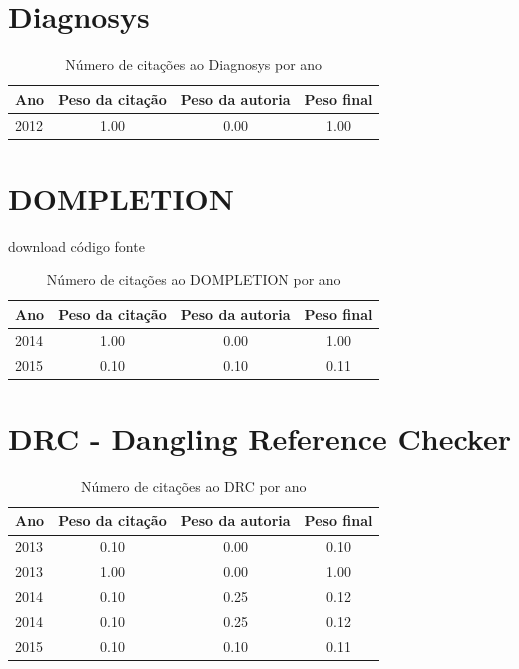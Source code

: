 \section{Diagnosys}
\begin{table}[H]
\caption{Número de citações ao Diagnosys por ano}
\centering
\begin{tabular}{| l | c | c | c |}
  \hline
  Ano & Peso da citação & Peso da autoria & Peso final \\
  \hline
  2012
    & 1.00
    & 0.00
    & {\color{blue} 1.00} \\
\hline
\end{tabular}
\end{table}
\section{DOMPLETION}
\checkmark download
\checkmark código fonte
\begin{table}[H]
\caption{Número de citações ao DOMPLETION por ano}
\centering
\begin{tabular}{| l | c | c | c |}
  \hline
  Ano & Peso da citação & Peso da autoria & Peso final \\
  \hline
  2014
    & 1.00
    & 0.00
    & {\color{blue} 1.00} \\
\hline
  2015
    & 0.10
    & 0.10
    & {\color{red} 0.11} \\
\hline
\end{tabular}
\end{table}
\section{DRC - Dangling Reference Checker}
\begin{table}[H]
\caption{Número de citações ao DRC  por ano}
\centering
\begin{tabular}{| l | c | c | c |}
  \hline
  Ano & Peso da citação & Peso da autoria & Peso final \\
  \hline
  2013
    & 0.10
    & 0.00
    & {\color{red} 0.10} \\
  2013
    & 1.00
    & 0.00
    & {\color{blue} 1.00} \\
\hline
  2014
    & 0.10
    & 0.25
    & {\color{red} 0.12} \\
  2014
    & 0.10
    & 0.25
    & {\color{red} 0.12} \\
\hline
  2015
    & 0.10
    & 0.10
    & {\color{red} 0.11} \\
\hline
\end{tabular}
\end{table}
